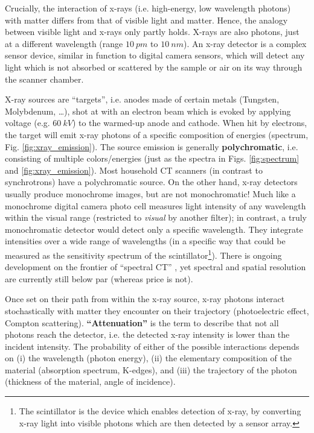\begin{change}
Crucially, the interaction of x-rays (i.e. high-energy, low wavelength photons) with matter differs from that of visible light and matter.
Hence, the analogy between visible light and x-rays only partly holds.
X-rays \citep{Berger2018,Buzug2008} are also photons, just at a different wavelength (range \(10\ pm\) to \(10\ nm\)).
An x-ray detector is a complex sensor device, similar in function to digital camera sensors, which will detect any light which is not absorbed or scattered by the sample or air on its way through the scanner chamber.
\end{change}
X-ray sources are ``targets'', i.e. anodes made of certain metals (Tungsten, Molybdenum, \ldots{}), shot at with an electron beam which is evoked by applying voltage (e.g. \(60\ kV\)) to the warmed-up anode and cathode.
When hit by electrons, the target will emit x-ray photons of a specific composition of energies (spectrum, Fig. \ref{fig:xray_emission}).
The source emission is generally \textbf{polychromatic}, i.e. consisting of multiple colors/energies (just as the spectra in Figs. \ref{fig:spectrum} and \ref{fig:xray_emission}).
Most household CT scanners (in contrast to synchrotrons) have a polychromatic source.
On the other hand, x-ray detectors usually produce monochrome images, but are not monochromatic!
Much like a monochrome digital camera photo cell measures light intensity of any wavelength within the visual range (restricted to \emph{visual} by another filter); in contrast, a truly monochromatic detector would detect only a specific wavelength.
They integrate intensities over a wide range of wavelengths (in a specific way that could be measured as the sensitivity spectrum of the scintillator\footnote{The scintillator is the device which enables detection of x-ray, by converting x-ray light into visible photons which are then detected by a sensor array.}).
There is ongoing development on the frontier of ``spectral CT'' \citep{Liu2023}, yet spectral and spatial resolution are currently still below par (whereas price is not).


\begin{change}
Once set on their path from within the x-ray source, x-ray photons interact stochastically with matter they encounter on their trajectory (photoelectric effect, Compton scattering).
\textbf{``Attenuation''} is the term to describe that not all photons reach the detector, i.e. the detected x-ray intensity is lower than the incident intensity.
The probability of either of the possible interactions depends on (i) the wavelength (photon energy), (ii) the elementary composition of the material (absorption spectrum, K-edges), and (iii) the trajectory of the photon (thickness of the material, angle of incidence).
\end{change}


